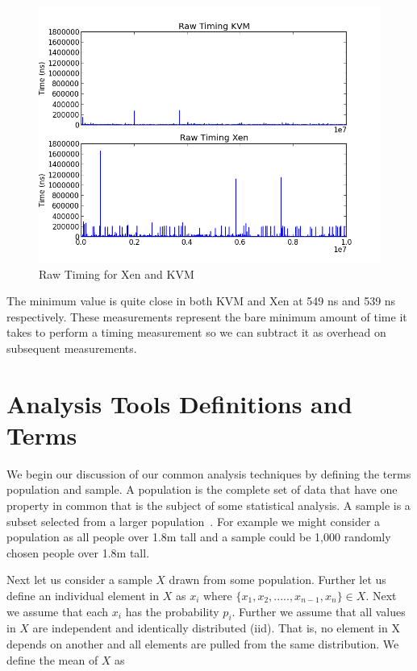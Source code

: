 \begin{figure}\label{RawTiming}
	  \centering
	  \includegraphics[width=\textwidth]{figures/RawTimingXenandKVM.png}
	  \caption{Raw Timing for Xen and KVM}
\end{figure}


The minimum value is quite close in both KVM and Xen at 549 ns and 539 ns respectively. These measurements represent the bare minimum amount of time it takes to perform a timing measurement so we can subtract it as overhead on subsequent measurements.  



\section{Analysis Tools Definitions and Terms}
We begin our discussion of our common analysis techniques by defining the terms population and sample. A population is the complete set of data that have one property in common that is the subject of some statistical analysis. A sample is a subset selected from a larger population~\cite{devore_probability_2011}. For example we might consider a population as all people over 1.8m tall and a sample could be 1,000 randomly chosen people over 1.8m tall. 

Next let us consider a sample $X$ drawn from some population. Further let us define an individual element in $X$ as $x_i$ where $ \{x_1, x_2, ....., x_{n-1}, x_n \} \in X$. Next we assume that each $x_i$ has the probability $p_i$. Further we assume that all values in $X$ are independent and identically distributed (iid). That is, no element in X depends on another and all elements are pulled from the same distribution.  We define the mean of $X$ as~\cite{wackerly_mathematical_2007} 

